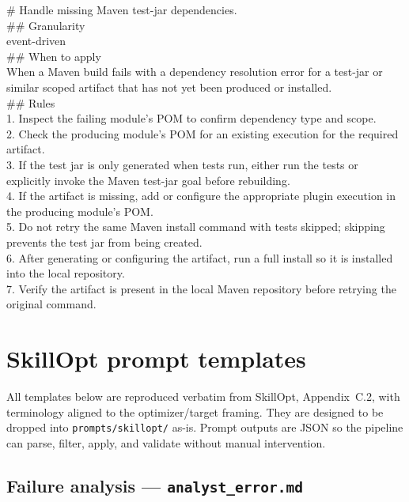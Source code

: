 \documentclass[11pt,a4paper]{article}
\begin{document}
\begin{promptbox}
\# Handle missing Maven test-jar dependencies.\\[0.3em]
\#\# Granularity\\
event-driven\\[0.3em]
\#\# When to apply\\
When a Maven build fails with a dependency resolution error for a
test-jar or similar scoped artifact that has not yet been produced or
installed.\\[0.3em]
\#\# Rules\\
1. Inspect the failing module's POM to confirm dependency type and
scope.\\
2. Check the producing module's POM for an existing execution for the
required artifact.\\
3. If the test jar is only generated when tests run, either run the
tests or explicitly invoke the Maven test-jar goal before rebuilding.\\
4. If the artifact is missing, add or configure the appropriate plugin
execution in the producing module's POM.\\
5. Do not retry the same Maven install command with tests skipped;
skipping prevents the test jar from being created.\\
6. After generating or configuring the artifact, run a full install
so it is installed into the local repository.\\
7. Verify the artifact is present in the local Maven repository before
retrying the original command.
\end{promptbox}

\section{SkillOpt prompt templates}
\label{sec:prompts}

All templates below are reproduced verbatim from SkillOpt, Appendix~C.2,
with terminology aligned to the optimizer/target framing. They are
designed to be dropped into \texttt{prompts/skillopt/} as-is. Prompt
outputs are JSON so the pipeline can parse, filter, apply, and validate
without manual intervention.

\subsection{Failure analysis --- \texttt{analyst\_error.md}}
\end{document}
